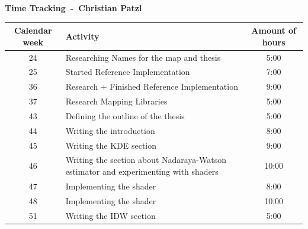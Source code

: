 \textbf{\huge Time Tracking~-~Christian Patzl}

\begin{table}[H]
    \centering
    \begin{tabularx}{\textwidth}{|c|X|c|}%
        \hline %
        Calendar week & Activity                                                                           & Amount of hours \\
        \hline %
        24            & Researching Names for the map and thesis                                           & 5:00            \\
        \hline %
        25            & Started Reference Implementation                                                   & 7:00            \\
        \hline %
        36            & Research + Finished Reference Implementation                                       & 9:00            \\
        \hline %
        37            & Research Mapping Libraries                                                         & 5:00            \\
        \hline %
        43            & Defining the outline of the thesis                                                 & 5:00            \\
        \hline %
        44            & Writing the introduction                                                           & 8:00            \\
        \hline %
        45            & Writing the KDE section                                                            & 9:00            \\
        \hline %
        46            & Writing the section about Nadaraya-Watson estimator and experimenting with shaders & 10:00           \\
        \hline %
        47            & Implementing the shader                                                            & 8:00            \\
        \hline %
        48            & Implementing the shader                                                            & 10:00           \\
        \hline %
        51            & Writing the IDW section                                                            & 5:00            \\
        \hline %

\end{tabularx}
\end{table}
